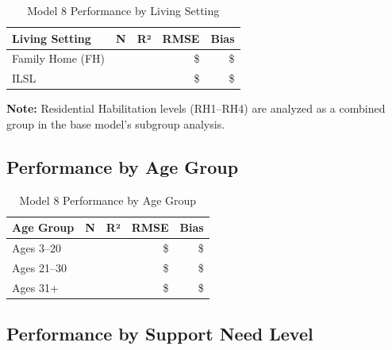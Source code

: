 \begin{table}[h]
\centering
\caption{Model 8 Performance by Living Setting}
\begin{tabular}{lrrrr}
\toprule
\textbf{Living Setting} & \textbf{N} & \textbf{R²} & \textbf{RMSE} & \textbf{Bias} \\
\midrule
Family Home (FH) & \ModelEightSubgrouplivingFHN{} & \ModelEightSubgrouplivingFHRSquared{} & \$\ModelEightSubgrouplivingFHRMSE{} & \$\ModelEightSubgrouplivingFHBias{} \\
ILSL & \ModelEightSubgrouplivingILSLN{} & \ModelEightSubgrouplivingILSLRSquared{} & \$\ModelEightSubgrouplivingILSLRMSE{} & \$\ModelEightSubgrouplivingILSLBias{} \\
\bottomrule
\end{tabular}
\end{table}

\textbf{Note:} Residential Habilitation levels (RH1--RH4) are analyzed as a combined group in the base model's subgroup analysis.

\subsection{Performance by Age Group}

\begin{table}[h]
\centering
\caption{Model 8 Performance by Age Group}
\begin{tabular}{lrrrr}
\toprule
\textbf{Age Group} & \textbf{N} & \textbf{R²} & \textbf{RMSE} & \textbf{Bias} \\
\midrule
Ages 3--20 & \ModelEightSubgroupageAgeUnderTwentyOneN{} & \ModelEightSubgroupageAgeUnderTwentyOneRSquared{} & \$\ModelEightSubgroupageAgeUnderTwentyOneRMSE{} & \$\ModelEightSubgroupageAgeUnderTwentyOneBias{} \\
Ages 21--30 & \ModelEightSubgroupageAgeTwentyOneToThirtyN{} & \ModelEightSubgroupageAgeTwentyOneToThirtyRSquared{} & \$\ModelEightSubgroupageAgeTwentyOneToThirtyRMSE{} & \$\ModelEightSubgroupageAgeTwentyOneToThirtyBias{} \\
Ages 31+ & \ModelEightSubgroupageAgeThirtyOnePlusN{} & \ModelEightSubgroupageAgeThirtyOnePlusRSquared{} & \$\ModelEightSubgroupageAgeThirtyOnePlusRMSE{} & \$\ModelEightSubgroupageAgeThirtyOnePlusBias{} \\
\bottomrule
\end{tabular}
\end{table}

\subsection{Performance by Support Need Level}

